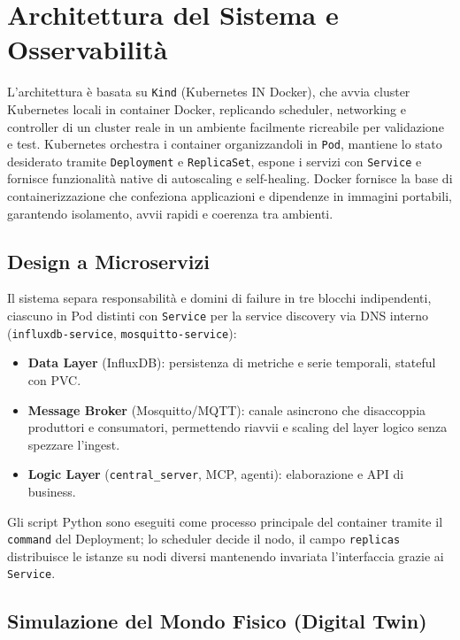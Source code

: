 
\chapter{Architettura del Sistema e Osservabilità}
\label{cap:architettura_osservabilita}

L'architettura è basata su \texttt{Kind} (Kubernetes IN Docker), che avvia cluster Kubernetes locali in container Docker, replicando scheduler, networking e controller di un cluster reale in un ambiente facilmente ricreabile per validazione e test. Kubernetes orchestra i container organizzandoli in \texttt{Pod}, mantiene lo stato desiderato tramite \texttt{Deployment} e \texttt{ReplicaSet}, espone i servizi con \texttt{Service} e fornisce funzionalità native di autoscaling e self-healing. Docker fornisce la base di containerizzazione che confeziona applicazioni e dipendenze in immagini portabili, garantendo isolamento, avvii rapidi e coerenza tra ambienti.

\section{Design a Microservizi}
\label{sec:design_microservizi}

Il sistema separa responsabilità e domini di failure in tre blocchi indipendenti, ciascuno in Pod distinti con \texttt{Service} per la service discovery via DNS interno (\texttt{influxdb-service}, \texttt{mosquitto-service}):
\begin{itemize}
    \item \textbf{Data Layer} (InfluxDB): persistenza di metriche e serie temporali, stateful con PVC.
    \item \textbf{Message Broker} (Mosquitto/MQTT): canale asincrono che disaccoppia produttori e consumatori, permettendo riavvii e scaling del layer logico senza spezzare l'ingest.
    \item \textbf{Logic Layer} (\texttt{central\_server}, MCP, agenti): elaborazione e API di business.
\end{itemize}
Gli script Python sono eseguiti come processo principale del container tramite il \texttt{command} del Deployment; lo scheduler decide il nodo, il campo \texttt{replicas} distribuisce le istanze su nodi diversi mantenendo invariata l'interfaccia grazie ai \texttt{Service}.

\section{Simulazione del Mondo Fisico (Digital Twin)}
\label{sec:digital_twin}

